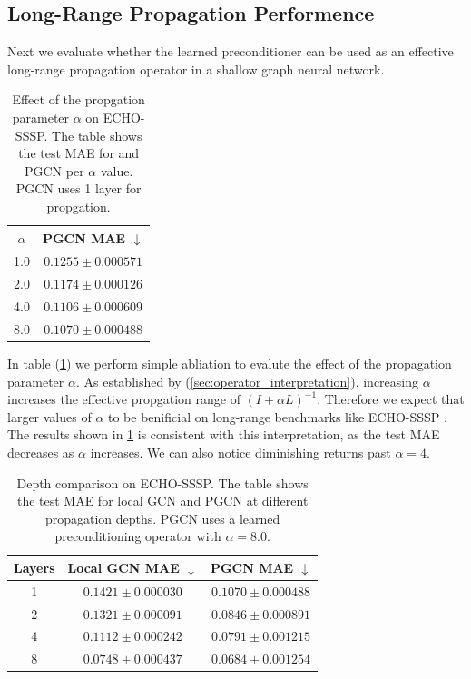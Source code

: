 \subsection{Long-Range Propagation Performence}

Next we evaluate whether the learned preconditioner can be used as an effective long-range
propagation operator in a shallow graph neural network.

\begin{table}[H]
    \centering
    \caption{
        Effect of the propgation parameter $\alpha$ on ECHO-SSSP. The table
        shows the test MAE for and PGCN per $\alpha$ value. PGCN uses 1 layer
        for propgation.
    }

    \label{tbl:echo_sssp_alphas}
    \begin{tabular}{c c}
        $\alpha$ & PGCN MAE   $\downarrow$ \\
        \hline
        1.0      & $0.1255 \pm 0.000571$   \\
        2.0      & $0.1174 \pm 0.000126$   \\
        4.0      & $0.1106 \pm 0.000609$   \\
        8.0      & $0.1070 \pm 0.000488$   \\
    \end{tabular}
\end{table}

In table (\ref{tbl:echo_sssp_alphas}) we perform simple abliation to evalute
the effect of the propagation parameter $\alpha$. As established by (\ref{sec:operator_interpretation}), increasing
$\alpha$ increases the effective propgation range of $(I + \alpha L)^{-1}$. Therefore we expect that larger values of $\alpha$ to
be benificial on long-range benchmarks like ECHO-SSSP
\cite{migliorCanYouHear2026}. The results shown in \ref{tbl:echo_sssp_alphas}
is consistent with this interpretation, as the test MAE decreases as $\alpha$
increases. We can also notice diminishing returns past $\alpha = 4$.

\begin{table}[H]
    \caption{
        Depth comparison on ECHO-SSSP. The table shows the test MAE for local
        GCN and PGCN at different propagation depths. PGCN uses a learned
        preconditioning operator with $\alpha = 8.0$.
    }
    \label{tbl:echo_sssp_layers}
    \centering
    \begin{tabular}{c c c}
        Layers & Local GCN MAE $\downarrow$ & PGCN MAE    $\downarrow$ \\
        \hline
        1      & $0.1421 \pm 0.000030$      & $0.1070 \pm 0.000488$    \\
        2      & $0.1321 \pm 0.000091$      & $0.0846\pm 0.000891$     \\
        4      & $0.1112\pm 0.000242$       & $0.0791\pm 0.001215$     \\
        8      & $0.0748\pm 0.000437$       & $0.0684 \pm 0.001254$    \\
    \end{tabular}
\end{table}

